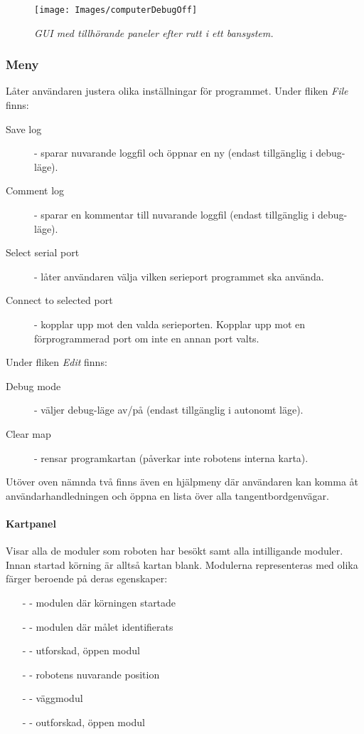 \documentclass[11pt]{article}
\begin{document}
\begin{figure}[htbp]
	\centering
	\texttt{[image: Images/computerDebugOff]}
	\caption{\textit{GUI med tillhörande paneler efter rutt i ett bansystem.} \label{DebugOff}}
\end{figure}

\subsubsection{Meny} Låter användaren justera olika inställningar för programmet. Under fliken \emph{File}  finns:
\begin{description}
	\item[Save log] - sparar nuvarande loggfil och öppnar en ny (endast tillgänglig i debug-läge).
	\item[Comment log] - sparar en kommentar till nuvarande loggfil (endast tillgänglig i debug-läge).
	\item[Select serial port] - låter användaren välja vilken serieport programmet ska använda.
	\item[Connect to selected port] - kopplar upp mot den valda serieporten. Kopplar upp mot en förprogrammerad port om inte en annan port valts. 
\end{description}

Under fliken \emph{Edit} finns:
\begin{description}
	\item[Debug mode] - väljer debug-läge av/på (endast tillgänglig i autonomt läge).
	\item [Clear map] - rensar programkartan (påverkar inte robotens interna karta).
\end{description}

Utöver oven nämnda två finns även en hjälpmeny där användaren kan komma åt användarhandledningen och öppna en lista över alla tangentbordgenvägar.

\paragraph{Kartpanel} Visar alla de moduler som roboten har besökt samt alla intilligande moduler. Innan startad körning är alltså kartan blank. Modulerna representeras med olika färger beroende på deras egenskaper:
\begin{itemize}
  \item[-]  - modulen där körningen startade
  \item[-]  - modulen där målet identifierats
  \item[-]  - utforskad, öppen modul
  \item[-]  - robotens nuvarande position
  \item[-]  - väggmodul
  \item[-]  - outforskad, öppen modul
\end{itemize}
\end{document}
